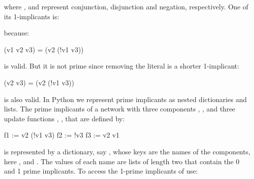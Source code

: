 \documentclass[letterpaper,10pt,english]{sphinxmanual}
\begin{document}
where \sphinxcode{\&}, \sphinxcode{\textbar{}} and \sphinxcode{!} represent conjunction, disjunction and negation, respectively.
One of its 1-implicants is:

\begin{sphinxVerbatim}[commandchars=\\\{\}]
    
\end{sphinxVerbatim}

because:

\begin{sphinxVerbatim}[commandchars=\\\{\}]
(v1 \PYGZam{} v2 \PYGZam{} v3) =\PYGZgt{} (v2 \PYGZam{} (!v1 \textbar{} v3))
\end{sphinxVerbatim}

is valid.
But it is not prime since removing the literal  is a shorter 1-implicant:

\begin{sphinxVerbatim}[commandchars=\\\{\}]
(v2 \PYGZam{} v3) =\PYGZgt{} (v2 \PYGZam{} (!v1 \textbar{} v3))
\end{sphinxVerbatim}

is also valid. In Python we represent prime implicants as nested dictionaries and lists.
The prime implicants of a network with three components , ,  and three update functions , ,  that are defined by:

\begin{sphinxVerbatim}[commandchars=\\\{\}]
f1 := v2 \PYGZam{} (!v1 \textbar{} v3)
f2 := !v3
f3 := v2 \textbar{} v1
\end{sphinxVerbatim}

is represented by a dictionary, say , whose keys are the names of the components, here ,  and .
The values of each name are lists of length two that contain the 0 and 1 prime implicants.
To access the 1-prime implicants of  use:

\begin{sphinxVerbatim}[commandchars=\\\{\}]
\PYG{p}{[}\PYG{p}{]}\PYG{p}{[}\PYG{p}{]}
\end{sphinxVerbatim}
\end{document}
